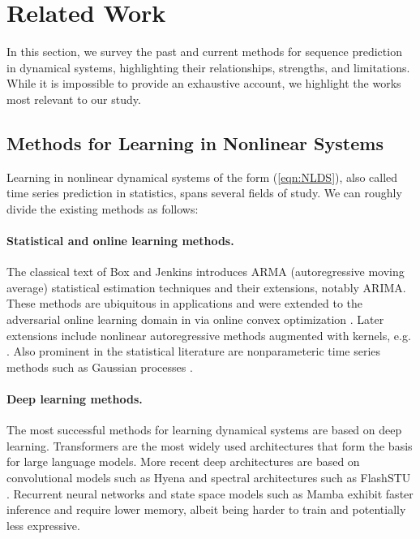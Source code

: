 \documentclass[11pt]{article}
\numberwithin{equation}{section}
\begin{document}
\section{Related Work}

In this section, we survey the past and current methods for sequence prediction in dynamical systems, highlighting their relationships, strengths, and limitations.
While it is impossible to provide an exhaustive account, we highlight the works most relevant to our study.

\subsection{Methods for Learning in Nonlinear Systems}

Learning in nonlinear dynamical systems of the form (\ref{eqn:NLDS}), also called time series prediction in statistics, spans several fields of study. We can roughly divide the existing methods as follows:

\paragraph{Statistical and online learning methods.}

The classical text of Box and Jenkins \cite{box1976time} introduces ARMA (autoregressive moving average) statistical estimation techniques and their extensions, notably ARIMA. These methods are ubiquitous in applications and were extended to the adversarial online learning domain in \cite{anava2013online,kuznetsov2018theory} via online convex optimization \cite{hazan2016introduction}. Later extensions include nonlinear autoregressive methods augmented with kernels, e.g. \cite{cuturi2011autoregressive}.  
Also prominent in the statistical literature are nonparameteric time series methods such as Gaussian processes \cite{rasmussen2003gaussian,murphy2012machine}.


\paragraph{Deep learning methods.}

The most successful methods for learning dynamical systems are based on deep learning. Transformers \cite{vaswani2017attention} are the most widely used architectures that form the basis for large language models. More recent deep architectures are based on convolutional models such as Hyena \cite{poli2023hyena} and spectral architectures such as FlashSTU \cite{liu2024flash}.
Recurrent neural networks and state space models such as Mamba \cite{gu2023mamba} exhibit faster inference and require lower memory, albeit being harder to train and potentially less expressive. 
\end{document}
